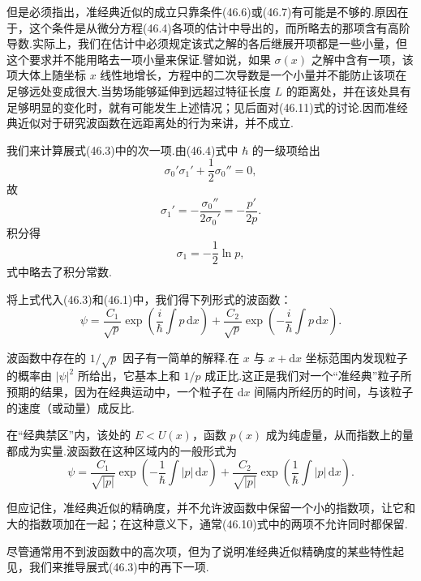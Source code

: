 但是必须指出，准经典近似的成立只靠条件(46.6)或(46.7)有可能是不够的.原因在于，这个条件是从微分方程(46.4)各项的估计中导出的，而所略去的那项含有高阶导数.实际上，我们在估计中必须规定该式之解的各后继展开项都是一些小量，但这个要求并不能用略去一项小量来保证.譬如说，如果 $\sigma(x)$ 之解中含有一项，该项大体上随坐标 $x$ 线性地增长，方程中的二次导数是一个小量并不能防止该项在足够远处变成很大.当势场能够延伸到远超过特征长度 $L$ 的距离处，并在该处具有足够明显的变化时，就有可能发生上述情况；见后面对(46.11)式的讨论.因而准经典近似对于研究波函数在远距离处的行为来讲，并不成立.

我们来计算展式(46.3)中的次一项.由(46.4)式中 $\hbar$ 的一级项给出
\begin{equation*}
  {\sigma_0'}{\sigma_1'}+\frac{1}{2}\sigma_0''=0,
\end{equation*}
故
\begin{equation*}
  \sigma_1'=-\frac{\sigma_0''}{2\sigma_0'}=-\frac{p'}{2p}.
\end{equation*}
积分得
\begin{equation}
  \sigma_1=-\frac{1}{2}\ln p,
\end{equation}
式中略去了积分常数.

将上式代入(46.3)和(46.1)中，我们得下列形式的波函数：
\begin{equation}
  \psi=\frac{C_1}{\sqrt{p}}\exp\left(\frac{i}{\hbar}\int p\,\mathrm{d}x\right)
  +\frac{C_2}{\sqrt{p}}\exp\left(-\frac{i}{\hbar}\int p\,\mathrm{d}x\right).
\end{equation}

波函数中存在的 $1/\sqrt{p}$ 因子有一简单的解释.在 $x$ 与 $x+\mathrm{d}x$ 坐标范围内发现粒子的概率由 $|\psi|^2$ 所给出，它基本上和 $1/p$ 成正比.这正是我们对一个“准经典”粒子所预期的结果，因为在经典运动中，一个粒子在 $\mathrm{d}x$ 间隔内所经历的时间，与该粒子的速度（或动量）成反比.

在“经典禁区”内，该处的 $E<U(x)$，函数 $p(x)$ 成为纯虚量，从而指数上的量都成为实量.波函数在这种区域内的一般形式为
\begin{equation}
  \psi=\frac{C_1}{\sqrt{|p|}}\exp\left(-\frac{1}{\hbar}\int|p|\,\mathrm{d}x\right)
  +\frac{C_2}{\sqrt{|p|}}\exp\left(\frac{1}{\hbar}\int|p|\,\mathrm{d}x\right).
\end{equation}

但应记住，准经典近似的精确度，并不允许波函数中保留一个小的指数项，让它和大的指数项加在一起；在这种意义下，通常(46.10)式中的两项不允许同时都保留.

尽管通常用不到波函数中的高次项，但为了说明准经典近似精确度的某些特性起见，我们来推导展式(46.3)中的再下一项.

